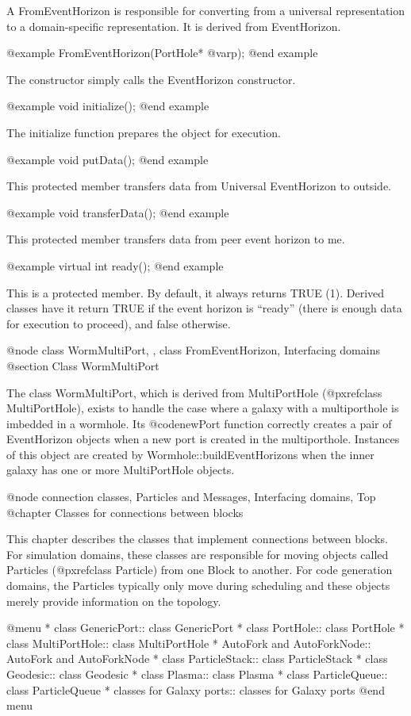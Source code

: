 A FromEventHorizon is responsible for converting from a universal
representation to a domain-specific representation.  It is derived from
EventHorizon.

@example
FromEventHorizon(PortHole* @var{p});
@end example

The constructor simply calls the EventHorizon constructor.

@example
void initialize();
@end example

The initialize function prepares the object for execution.

@example
void putData();
@end example

This protected member transfers data from Universal EventHorizon to outside.

@example
void transferData();
@end example

This protected member transfers data from peer event horizon to me.

@example
virtual int ready();
@end example

This is a protected member.  By default, it always returns TRUE (1).
Derived classes have it return TRUE if the event horizon is ``ready''
(there is enough data for execution to proceed), and false otherwise.

@node class WormMultiPort,  , class FromEventHorizon, Interfacing domains
@section Class WormMultiPort

The class WormMultiPort, which is derived from MultiPortHole
(@pxref{class MultiPortHole}), exists to
handle the case where a galaxy with a multiporthole is imbedded in a
wormhole.  Its @code{newPort} function correctly creates a pair of
EventHorizon objects when a new port is created in the multiporthole.
Instances of this object are created by Wormhole::buildEventHorizons
when the inner galaxy has one or more MultiPortHole objects.

@node connection classes, Particles and Messages, Interfacing domains, Top
@chapter Classes for connections between blocks

This chapter describes the classes that implement connections between
blocks.  For simulation domains, these classes are responsible for
moving objects called Particles (@pxref{class Particle})
from one Block to another.  For code
generation domains, the Particles typically only move during scheduling
and these objects merely provide information on the topology.

@menu
* class GenericPort::           class GenericPort
* class PortHole::              class PortHole
* class MultiPortHole::         class MultiPortHole
* AutoFork and AutoForkNode::   AutoFork and AutoForkNode
* class ParticleStack::         class ParticleStack
* class Geodesic::              class Geodesic
* class Plasma::                class Plasma
* class ParticleQueue::         class ParticleQueue
* classes for Galaxy ports::    classes for Galaxy ports
@end menu

